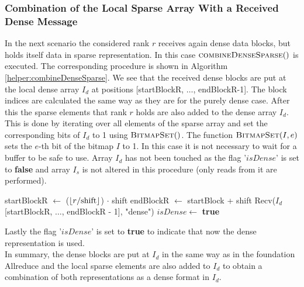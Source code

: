 \subsubsection{Combination of the Local Sparse Array With a Received Dense Message}
In the next scenario the considered rank $r$ receives again dense data blocks, but holds itself data in sparse representation. In this case $\Call{combineDenseSparse}{ }$ is executed. The corresponding procedure is shown in Algorithm \ref{helper:combineDenseSparse}. We see that the received dense blocks are put at the local dense array $I_d$ at positions [startBlockR, $\dots$, endBlockR-1]. The block indices are calculated the same way as they are for the purely dense case. After this the sparse elements that rank $r$ holds are also added to the dense array $I_d$. This is done by iterating over all elements of the sparse array and set the corresponding bits of $I_d$ to 1 using $\Call{BitmapSet}{ }$. The function $\Call{BitmapSet}{I, e}$ sets the $e$-th bit of the bitmap $I$ to 1. In this case it is not necessary to wait for a buffer to be safe to use. Array $I_d$ has not been touched as the flag '$isDense$' is set to \textbf{false} and array $I_s$ is not altered in this procedure (only reads from it are performed). 
\begin{algorithm}[h]
	\caption{– combine received dense blocks with own sparse representation.\\
	Variable nomenclature is the same as in Algorithm \ref{algo:SetUnionExactHalving}. Changes of variables apply to the original ones.}
	\label{helper:combineDenseSparse}
	\begin{algorithmic}[1]
			\State startBlockR $\gets$ ($\lfloor r/\text{shift}\rfloor$) $\cdot$ shift
			\State endBlockR $\gets$ startBlock + shift
			\State Recv($I_d$[startBlockR, $\dots$, endBlockR - 1], "dense")
			 
			\State {}
			\EndFor	
			\State $isDense \gets$ \textbf{true}
		\EndProcedure
	\end{algorithmic}
\end{algorithm}
Lastly the flag '$isDense$' is set to \textbf{true} to indicate that now the dense representation is used. \\
In summary, the dense blocks are put at $I_d$ in the same way as in the foundation Allreduce and the local sparse elements are also added to $I_d$ to obtain a combination of both representations as a dense format in $I_d$.

